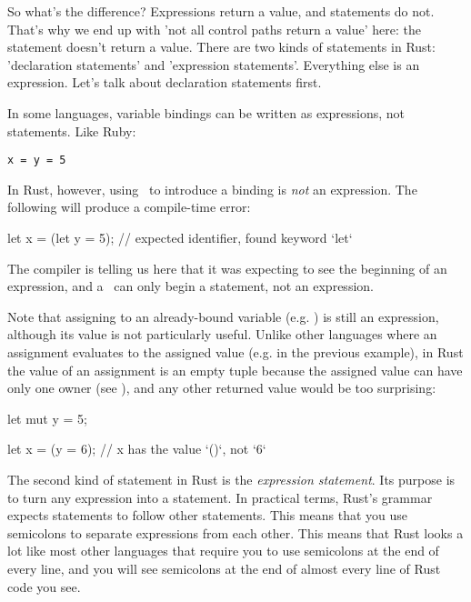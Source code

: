 \blank

So what's the difference? Expressions return a value, and statements do not. That's why we end up with 'not all control paths 
return a value' here: the statement  doesn't return a value. There are two kinds of statements in Rust: 'declaration
statements' and 'expression statements'. Everything else is an expression. Let's talk about declaration statements first.

\blank

In some languages, variable bindings can be written as expressions, not statements. Like Ruby:

\begin{verbatim}
x = y = 5
\end{verbatim}

In Rust, however, using \keylet\ to introduce a binding is \emph{not} an expression. The following will produce a compile-time
error:

\begin{rustc}
let x = (let y = 5); // expected identifier, found keyword `let`
\end{rustc}

The compiler is telling us here that it was expecting to see the beginning of an expression, and a \keylet\ can only begin a
statement, not an expression.

\blank

Note that assigning to an already-bound variable (e.g. ) is still an expression, although its value is not 
particularly useful. Unlike other languages where an assignment evaluates to the assigned value (e.g.  in the previous
example), in Rust the value of an assignment is an empty tuple \code{()} because the assigned value can have only one owner 
(see ), and any other returned value would be too surprising:

\begin{rustc}
let mut y = 5;

let x = (y = 6);  // x has the value `()`, not `6`
\end{rustc}

The second kind of statement in Rust is the \emph{expression statement}. Its purpose is to turn any expression into a statement. 
In practical terms, Rust's grammar expects statements to follow other statements. This means that you use semicolons to separate
expressions from each other. This means that Rust looks a lot like most other languages that require you to use semicolons at the 
end of every line, and you will see semicolons at the end of almost every line of Rust code you see.

